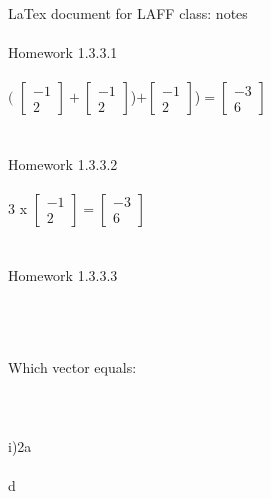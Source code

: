 \documentclass[11pt]{article}
\begin{document}
LaTex document for LAFF class: notes
\\
\\
Homework 1.3.3.1
\\
\\$($
$\begin{bmatrix}
{-1} \\
{2}
\end{bmatrix}
+
\begin{bmatrix}
{-1}\\
{2}
\end{bmatrix}
$)$
+
\begin{bmatrix}
{-1}\\
{2}
\end{bmatrix}
$)$
=
\begin{bmatrix}
{-3}\\
{ 6}
\end{bmatrix}
$
\\
\\
\\
Homework 1.3.3.2
\\
\\
3 
x
$
\begin{bmatrix}
{-1}\\
{2}
\end{bmatrix}
=
\begin{bmatrix}
-{3}\\
{ 6}
\end{bmatrix}
$
\\
\\
\\
Homework 1.3.3.3\\
\\
\\
\\Which vector equals: \\
\\
\\
\\
\newpage
i)2a\\
\\
d
\end{document}
